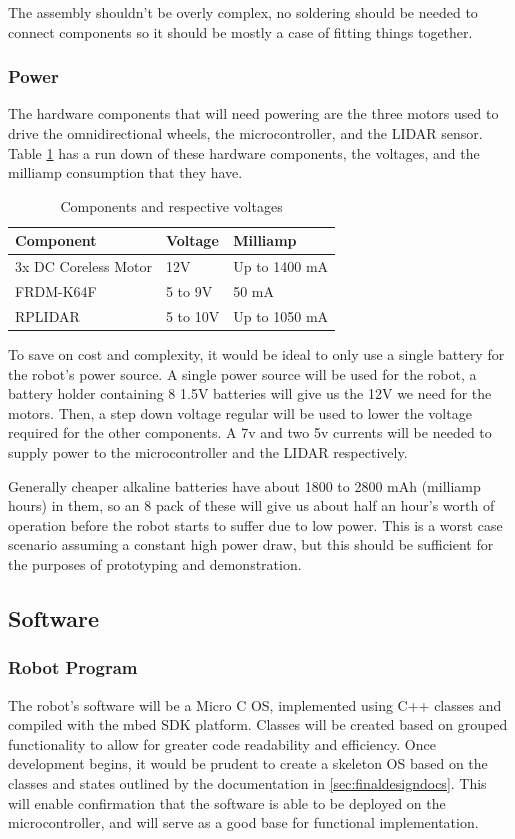 				The assembly shouldn't be overly complex, no soldering should be needed to connect components so it should be mostly a case of fitting things together.
				
				\subsubsection{Power}
				The hardware components that will need powering are the three motors used to drive the omnidirectional wheels, the microcontroller, and the LIDAR sensor. Table \ref{table:1} has a run down of these hardware components, the voltages, and the milliamp consumption that they have.
				
				\begin{table}[h]
					\centering
					\begin{tabular}{|| l | l | l ||} 
						\hline
						Component & Voltage & Milliamp \\ [0.5ex] 
						\hline
						3x DC Coreless Motor  & 12V & Up to 1400 mA  \\ 
						FRDM-K64F  & 5 to 9V &  50 mA \\
						RPLIDAR  & 5 to 10V & Up to 1050 mA\\
						\hline
					\end{tabular}
					\caption{Components and respective voltages}
					\label{table:1}
				\end{table}
				
				To save on cost and complexity, it would be ideal to only use a single battery for the robot's power source. A single power source will be used for the robot, a battery holder containing 8 1.5V batteries will give us the 12V we need for the motors. Then, a step down voltage regular will be used to lower the voltage required for the other components. A 7v and two 5v currents will be needed to supply power to the microcontroller and the LIDAR respectively.
				
				Generally cheaper alkaline batteries have about 1800 to 2800 mAh (milliamp hours) in them, so an 8 pack of these will give us about half an hour's worth of operation before the robot starts to suffer due to low power. This is a worst case scenario assuming a constant high power draw, but this should be sufficient for the purposes of prototyping and demonstration. 
				
			\subsection{Software}
				\subsubsection{Robot Program}
				The robot's software will be a Micro C OS, implemented using C++ classes and compiled with the mbed SDK platform. Classes will be created based on grouped functionality to allow for greater code readability and efficiency. Once development begins, it would be prudent to create a skeleton OS based on the classes and states outlined by the documentation in \ref{sec:finaldesigndocs}. This will enable confirmation that the software is able to be deployed on the microcontroller, and will serve as a good base for functional implementation.
		

